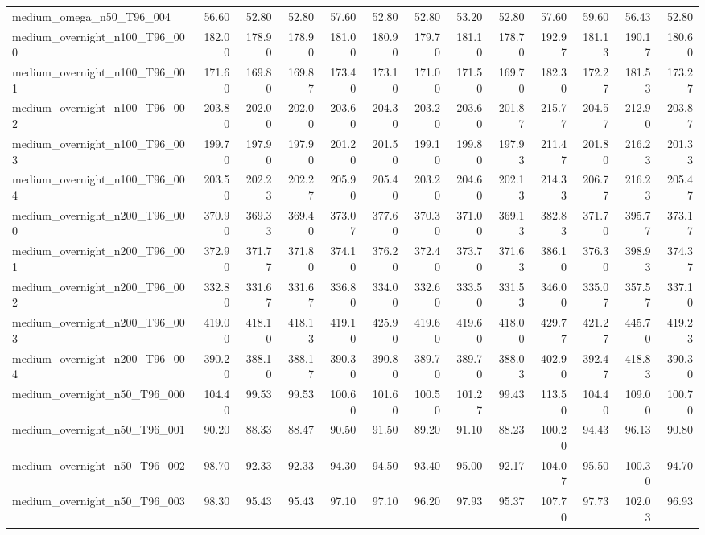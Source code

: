 \begin{table}[htbp]
\begin{tabular}{lrrrrrrrrrrrr}
medium\_omega\_n50\_T96\_004 & 56.60 & 52.80 & 52.80 & 57.60 & 52.80 & 52.80 & 53.20 & 52.80 & 57.60 & 59.60 & 56.43 & 52.80 \\
medium\_overnight\_n100\_T96\_000 & 182.00 & 178.90 & 178.90 & 181.00 & 180.90 & 179.70 & 181.10 & 178.70 & 192.97 & 181.13 & 190.17 & 180.60 \\
medium\_overnight\_n100\_T96\_001 & 171.60 & 169.80 & 169.87 & 173.40 & 173.10 & 171.00 & 171.50 & 169.70 & 182.30 & 172.27 & 181.53 & 173.27 \\
medium\_overnight\_n100\_T96\_002 & 203.80 & 202.00 & 202.00 & 203.60 & 204.30 & 203.20 & 203.60 & 201.87 & 215.77 & 204.57 & 212.90 & 203.87 \\
medium\_overnight\_n100\_T96\_003 & 199.70 & 197.90 & 197.90 & 201.20 & 201.50 & 199.10 & 199.80 & 197.93 & 211.47 & 201.80 & 216.23 & 201.33 \\
medium\_overnight\_n100\_T96\_004 & 203.50 & 202.23 & 202.27 & 205.90 & 205.40 & 203.20 & 204.60 & 202.13 & 214.33 & 206.77 & 216.23 & 205.47 \\
medium\_overnight\_n200\_T96\_000 & 370.90 & 369.33 & 369.40 & 373.07 & 377.60 & 370.30 & 371.00 & 369.13 & 382.83 & 371.70 & 395.77 & 373.17 \\
medium\_overnight\_n200\_T96\_001 & 372.90 & 371.77 & 371.80 & 374.10 & 376.20 & 372.40 & 373.70 & 371.63 & 386.10 & 376.30 & 398.93 & 374.37 \\
medium\_overnight\_n200\_T96\_002 & 332.80 & 331.67 & 331.67 & 336.80 & 334.00 & 332.60 & 333.50 & 331.53 & 346.00 & 335.07 & 357.57 & 337.10 \\
medium\_overnight\_n200\_T96\_003 & 419.00 & 418.10 & 418.13 & 419.10 & 425.90 & 419.60 & 419.60 & 418.00 & 429.77 & 421.27 & 445.70 & 419.23 \\
medium\_overnight\_n200\_T96\_004 & 390.20 & 388.10 & 388.17 & 390.30 & 390.80 & 389.70 & 389.70 & 388.03 & 402.90 & 392.47 & 418.83 & 390.30 \\
medium\_overnight\_n50\_T96\_000 & 104.40 & 99.53 & 99.53 & 100.60 & 101.60 & 100.50 & 101.27 & 99.43 & 113.50 & 104.40 & 109.00 & 100.70 \\
medium\_overnight\_n50\_T96\_001 & 90.20 & 88.33 & 88.47 & 90.50 & 91.50 & 89.20 & 91.10 & 88.23 & 100.20 & 94.43 & 96.13 & 90.80 \\
medium\_overnight\_n50\_T96\_002 & 98.70 & 92.33 & 92.33 & 94.30 & 94.50 & 93.40 & 95.00 & 92.17 & 104.07 & 95.50 & 100.30 & 94.70 \\
medium\_overnight\_n50\_T96\_003 & 98.30 & 95.43 & 95.43 & 97.10 & 97.10 & 96.20 & 97.93 & 95.37 & 107.70 & 97.73 & 102.03 & 96.93 \\

\end{tabular}
\end{table}
